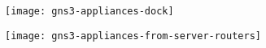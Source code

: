 \begin{figure}
\centering
\begin{minipage}{.4\textwidth}
  \centering
  \texttt{[image: gns3-appliances-dock]}
  \label{fig:gns3-appliances-dock}
\end{minipage}%
\begin{minipage}{.6\textwidth}
  \centering
  \texttt{[image: gns3-appliances-from-server-routers]}
  \label{fig:gns3-appliances-from-server-routers}
\end{minipage}
\end{figure}
